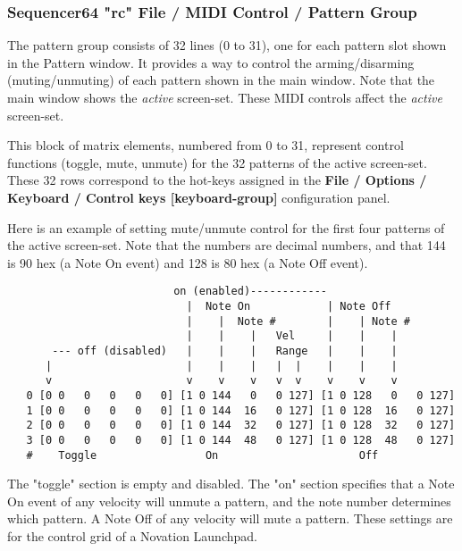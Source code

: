 \subsubsection{Sequencer64 "rc" File / MIDI Control / Pattern Group}
\label{subsubsec:seq64_rc_file_midi_ctrl_pattern}

   The pattern group consists of 32 lines (0 to 31), one for each
   pattern slot shown in the Pattern window.
   It provides a way to control the arming/disarming (muting/unmuting) of
   each pattern shown in the main window.  Note that the main window
   shows the \textsl{active} screen-set.  These MIDI controls affect the
   \textsl{active} screen-set.

   This block of matrix elements, numbered from 0 to 31,
   represent control functions (toggle, mute, unmute) for the 32 patterns
   of the active screen-set.
   These 32 rows correspond to the hot-keys assigned in
   the \textbf{File / Options / Keyboard / Control keys [keyboard-group]} 
   configuration panel.

   Here is an example of setting mute/unmute control for the first four
   patterns of the active screen-set.  Note that the numbers are decimal
   numbers, and that 144 is 90 hex (a Note On event) and 128 is 80 hex (a Note
   Off event).

   \begin{verbatim}
                          on (enabled)------------
                            |  Note On            | Note Off
                            |    |  Note #        |    | Note #
                            |    |    |   Vel     |    |    |
       --- off (disabled)   |    |    |   Range   |    |    |
      |                     |    |    |   |  |    |    |    |
      v                     v    v    v   v  v    v    v    v
   0 [0 0   0   0   0   0] [1 0 144   0   0 127] [1 0 128   0   0 127]
   1 [0 0   0   0   0   0] [1 0 144  16   0 127] [1 0 128  16   0 127]
   2 [0 0   0   0   0   0] [1 0 144  32   0 127] [1 0 128  32   0 127]
   3 [0 0   0   0   0   0] [1 0 144  48   0 127] [1 0 128  48   0 127]
   #    Toggle                 On                      Off
   \end{verbatim}

   The "toggle" section is empty and disabled.  The "on" section specifies that
   a Note On event of any velocity will unmute a pattern, and the note number
   determines which pattern.  A Note Off of any velocity will mute a pattern.
   These settings are for the control grid of a Novation Launchpad.

